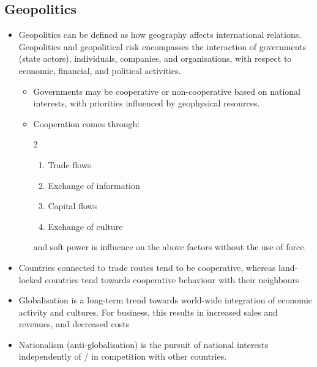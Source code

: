 \documentclass[../notes_compiled.tex]{subfiles}
\begin{document}
\subsection{Geopolitics}

\begin{itemize}
\item Geopolitics can be defined as how geography affects international relations. Geopolitics and geopolitical risk encompasses the interaction of governments (state actors), individuals, companies, and organisations, with respect to economic, financial, and political activities.
\begin{itemize}
\item Governments may be cooperative or non-cooperative based on national interests, with priorities influenced by geophysical resources.
\item Cooperation comes through:
\begin{multicols}{2}
\begin{enumerate}
\item[1.] Trade flows
\item[3.] Exchange of information
\item[2.] Capital flows
\item[4.] Exchange of culture
\end{enumerate}
\end{multicols}
and soft power is influence on the above factors without the use of force.
\end{itemize}
\item Countries connected to trade routes tend to be cooperative, whereas land-locked countries tend towards cooperative behaviour with their neighbours
\item Globalisation is a long-term trend towards world-wide integration of economic activity and cultures. For business, this results in increased sales and revenues, and decreased costs
\item Nationalism (anti-globalisation) is the pursuit of national interests independently of / in competition with other countries.


\end{itemize}
\end{document}
